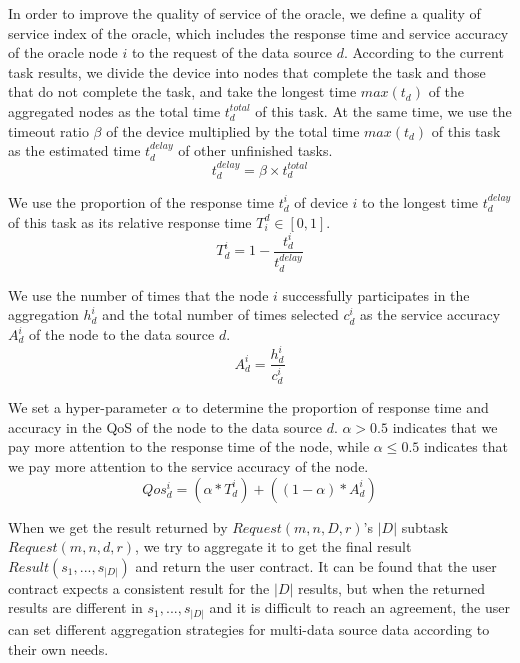 \documentclass[paper]{ieice}
\begin{document}
In order to improve the quality of service of the oracle, we define a quality of service index of the oracle, which includes the response time and service accuracy of the oracle node $i$ to the request of the data source $d$. According to the current task results, we divide the device into nodes that complete the task and those that do not complete the task, and take the longest time $max(t_d)$ of the aggregated nodes as the total time $t_d^{total}$ of this task. At the same time, we use the timeout ratio $\beta$ of the device multiplied by the total time $max(t_d)$ of this task as the estimated time $t_d^{delay}$ of other unfinished tasks.
 \begin{equation}
    t_d^{delay} = \beta \times t_d^{total}
\end{equation}

We use the proportion of the response time $t_{d}^{i}$ of device $i$ to the longest time $t_d^{delay}$ of this task as its relative response time $T^d_{i} \in [0,1]$.
\begin{equation}
    T_d^{i} = 1 - \frac{t_{d}^{i}}{ t_d^{delay}}
\end{equation}

We use the number of times that the node $i$ successfully participates in the aggregation $h_d^i$ and the total number of times selected $c_d^i$ as the service accuracy $A_d^i$ of the node to the data source $d$.
 \begin{equation}
    A_d^i = \frac{h_d^i}{c_d^i}
\end{equation}

We set a hyper-parameter $\alpha$ to determine the proportion of response time and accuracy in the QoS of the node to the data source $d$. $\alpha > 0.5$ indicates that we pay more attention to the response time of the node, while $\alpha \leq 0.5$ indicates that we pay more attention to the service accuracy of the node.
\begin{equation}
    Qos_d^i = (\alpha * T_d^{i}) + ((1 - \alpha) * A_d^i)
\end{equation}

When we get the result returned by $Request(m,n,D,r)$'s $|D|$ subtask $Request(m,n,d,r)$, we try to aggregate it to get the final result $Result(s_1,...,s_{|D|})$ and return the user contract. It can be found that the user contract expects a consistent result for the $|D|$ results, but when the returned results are different in $s_1,...,s_{|D|}$ and it is difficult to reach an agreement, the user can set different aggregation strategies for multi-data source data according to their own needs.
\end{document}
